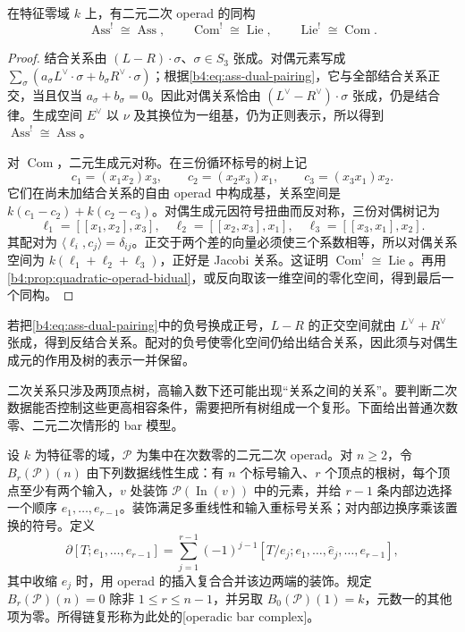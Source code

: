 \begin{proposition}\label{b4:prop:classical-operad-duals}
	在特征零域 \(k\) 上，有二元二次 operad 的同构
	\[
		\operatorname{Ass}^!\cong\operatorname{Ass},\qquad
		\operatorname{Com}^!\cong\operatorname{Lie},\qquad
		\operatorname{Lie}^!\cong\operatorname{Com}.
	\]
\end{proposition}
\begin{proof}
	结合关系由 \((L-R)\cdot\sigma\)、\(\sigma\in S_3\) 张成。对偶元素写成 \(\sum_\sigma(a_\sigma L^\vee\cdot\sigma+b_\sigma R^\vee\cdot\sigma)\)；根据\eqref{b4:eq:ass-dual-pairing}，它与全部结合关系正交，当且仅当 \(a_\sigma+b_\sigma=0\)。因此对偶关系恰由 \((L^\vee-R^\vee)\cdot\sigma\) 张成，仍是结合律。生成空间 \(E^\vee\) 以 \(\nu\) 及其换位为一组基，仍为正则表示，所以得到 \(\operatorname{Ass}^!\cong\operatorname{Ass}\)。

	对 \(\operatorname{Com}\)，二元生成元对称。在三份循环标号的树上记
	\[
		c_1=(x_1x_2)x_3,\qquad c_2=(x_2x_3)x_1,\qquad c_3=(x_3x_1)x_2.
	\]
	它们在尚未加结合关系的自由 operad 中构成基，关系空间是 \(k(c_1-c_2)+k(c_2-c_3)\)。对偶生成元因符号扭曲而反对称，三份对偶树记为
	\[
		\ell_1=[[x_1,x_2],x_3],\quad \ell_2=[[x_2,x_3],x_1],\quad \ell_3=[[x_3,x_1],x_2].
	\]
	其配对为 \(\langle\ell_i,c_j\rangle=\delta_{ij}\)。正交于两个差的向量必须使三个系数相等，所以对偶关系空间为 \(k(\ell_1+\ell_2+\ell_3)\)，正好是 Jacobi 关系。这证明 \(\operatorname{Com}^!\cong\operatorname{Lie}\)。再用\cref{b4:prop:quadratic-operad-bidual}，或反向取该一维空间的零化空间，得到最后一个同构。
\end{proof}

若把\eqref{b4:eq:ass-dual-pairing}中的负号换成正号，\(L-R\) 的正交空间就由 \(L^\vee+R^\vee\) 张成，得到反结合关系。配对的负号使零化空间仍给出结合关系，因此须与对偶生成元的作用及树的表示一并保留。

\ProseParagraphBreak
二次关系只涉及两顶点树，高输入数下还可能出现“关系之间的关系”。要判断二次数据能否控制这些更高相容条件，需要把所有树组成一个复形。下面给出普通次数零、二元二次情形的 bar 模型。

\begin{definition}\label{b4:def:operadic-bar-complex}
	设 \(k\) 为特征零的域，\(\mathcal P\) 为集中在次数零的二元二次 operad。对 \(n\ge2\)，令 \(B_r(\mathcal P)(n)\) 由下列数据线性生成：有 \(n\) 个标号输入、\(r\) 个顶点的根树，每个顶点至少有两个输入，\(v\) 处装饰 \(\mathcal P(\operatorname{In}(v))\) 中的元素，并给 \(r-1\) 条内部边选择一个顺序 \(e_1,\ldots,e_{r-1}\)。装饰满足多重线性和输入重标号关系；对内部边换序乘该置换的符号。定义
	\begin{equation}\label{b4:eq:operadic-bar-boundary}
		\partial[T;e_1,\ldots,e_{r-1}]
		=\sum_{j=1}^{r-1}(-1)^{j-1}[T/e_j;e_1,\ldots,\widehat e_j,\ldots,e_{r-1}],
	\end{equation}
	其中收缩 \(e_j\) 时，用 operad 的插入复合合并该边两端的装饰。规定 \(B_r(\mathcal P)(n)=0\) 除非 \(1\le r\le n-1\)，并另取 \(B_0(\mathcal P)(1)=k\)，元数一的其他项为零。所得链复形称为此处的[operadic bar complex]。
\end{definition}

